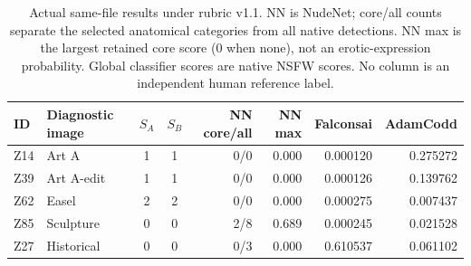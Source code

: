 \begin{table}[t]
\centering\small
\begin{tabular}{@{}llccrrrr@{}}
\toprule
ID & Diagnostic image & $S_A$ & $S_B$ & NN core/all & NN max & Falconsai & AdamCodd \\
\midrule
Z14 & Art A & 1 & 1 & 0/0 & 0.000 & 0.000120 & 0.275272 \\
Z39 & Art A-edit & 1 & 1 & 0/0 & 0.000 & 0.000126 & 0.139762 \\
Z62 & Easel & 2 & 2 & 0/0 & 0.000 & 0.000275 & 0.007437 \\
Z85 & Sculpture & 0 & 0 & 2/8 & 0.689 & 0.000245 & 0.021528 \\
Z27 & Historical & 0 & 0 & 0/3 & 0.000 & 0.610537 & 0.061102 \\
\bottomrule
\end{tabular}
\caption{Actual same-file results under rubric v1.1. NN is NudeNet; core/all counts separate the selected anatomical categories from all native detections. NN max is the largest retained core score (0 when none), not an erotic-expression probability. Global classifier scores are native NSFW scores. No column is an independent human reference label.}
\label{tab:diagnostic}
\end{table}

